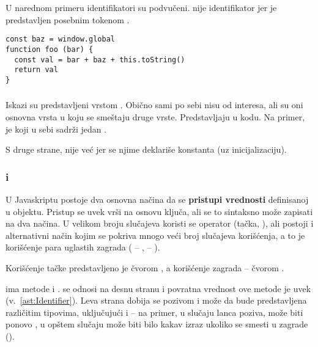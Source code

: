 U narednom primeru identifikatori su podvučeni.
 nije identifikator jer je predstavljen posebnim tokenom .

\begin{lstlisting}[keywords={baz, window, global, foo, bar, val, toString},keywordstyle={\underbar}]
const baz = window.global
function foo (bar) {
  const val = bar + baz + this.toString()
  return val
}
\end{lstlisting}

\subsubsection{}
\label{ast:ExpressionStatement}

Iskazi su predstavljeni vrstom .
Obično sami po sebi nisu od interesa, ali su oni osnovna vrsta u koju se smeštaju druge vrste.
Predstavljaju  u kodu.
Na primer,  je  koji u sebi sadrži jedan .

S druge strane,  nije  već  jer se njime deklariše konstanta (uz inicijalizaciju).

\subsubsection{ i }
\label{ast:PropertyAccessExpression}
\label{ast:ElementAccessExpression}

U Javaskriptu postoje dva osnovna načina da se \textbf{pristupi vrednosti} definisanoj u objektu.
Pristup se uvek vrši na osnovu ključa, ali se to sintaksno može zapisati na dva načina.
U velikom broju slučajeva koristi se operator  (tačka, ), ali postoji i alternativni način kojim se pokriva mnogo veći broj slučajeva korišćenja, a to je korišćenje para uglastih zagrada (\code{[} -- , \code{]} -- ).

Korišćenje tačke predstavljeno je čvorom , a korišćenje zagrada -- čvorom .

 ima metode  i .
 se odnosi na desnu stranu i povratna vrednost ove metode je uvek  (v.~\cref{ast:Identifier}).
Leva strana dobija se pozivom  i može da bude predstavljena različitim tipovima, uključujući i  -- na primer, u slučaju lanca poziva, može biti ponovo , u opštem slučaju može biti bilo kakav izraz ukoliko se smesti u zagrade ().

